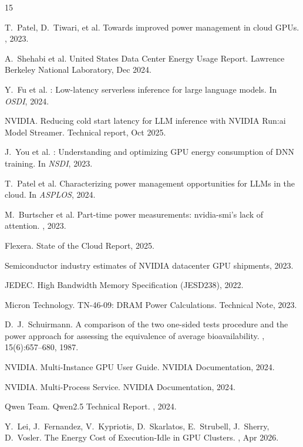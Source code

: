 \documentclass[sigconf,nonacm]{acmart}
\begin{document}

\def\bibfont{\normalsize}
\begin{thebibliography}{15}

T.~Patel, D.~Tiwari, et al.
\newblock Towards improved power management in cloud GPUs.
, 2023.

A.~Shehabi et al.
 United States Data Center Energy Usage Report.
\newblock Lawrence Berkeley National Laboratory, Dec 2024.

Y.~Fu et al.
: Low-latency serverless inference for large language models.
\newblock In {\em OSDI}, 2024.

NVIDIA.
\newblock Reducing cold start latency for LLM inference with {NVIDIA Run:ai} Model Streamer.
\newblock Technical report, Oct 2025.

J.~You et al.
: Understanding and optimizing GPU energy consumption of DNN training.
\newblock In {\em NSDI}, 2023.

T.~Patel et al.
\newblock Characterizing power management opportunities for LLMs in the cloud.
\newblock In {\em ASPLOS}, 2024.

M.~Burtscher et al.
\newblock Part-time power measurements: nvidia-smi's lack of attention.
, 2023.

Flexera.
 State of the Cloud Report, 2025.

Semiconductor industry estimates of NVIDIA datacenter GPU shipments, 2023.

JEDEC.
 High Bandwidth Memory Specification ({JESD238}), 2022.

Micron Technology.
\newblock TN-46-09: DRAM Power Calculations.
\newblock Technical Note, 2023.

D.~J.~Schuirmann.
\newblock A comparison of the two one-sided tests procedure and the power approach for assessing the equivalence of average bioavailability.
, 15(6):657--680, 1987.

NVIDIA.
\newblock Multi-Instance GPU User Guide.
\newblock NVIDIA Documentation, 2024.

NVIDIA.
\newblock Multi-Process Service.
\newblock NVIDIA Documentation, 2024.

Qwen Team.
\newblock Qwen2.5 Technical Report.
, 2024.

Y.~Lei, J.~Fernandez, V.~Kypriotis, D.~Skarlatos, E.~Strubell, J.~Sherry, D.~Vosler.
\newblock The Energy Cost of Execution-Idle in {GPU} Clusters.
, Apr 2026.

\end{thebibliography}
\end{document}
